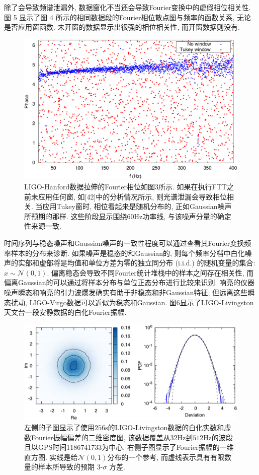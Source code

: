 \documentclass[a4paper]{\documentclassname}
\def\t{\text}
\theoremstyle{definition}
\begin{document}
除了会导致频谱泄漏外, 数据窗化不当还会导致Fourier变换中的虚假相位相关性. 图 5 显示了图 4 所示的相同数据段的Fourier相位散点图与频率的函数关系, 无论是否应用窗函数. 未开窗的数据显示出很强的相位相关性, 而开窗数据则没有. 
\begin{figure}[htbp]
    \centering
    \includegraphics{img/5.jpg}
    \caption{
        LIGO-Hanford数据拉伸的Fourier相位如图3所示. 如果在执行FTT之前未应用任何窗, 如[42]中的分析情况所示, 则光谱泄漏会导致相位相关. 当应用Tukey窗时, 相位看起来是随机分布的, 正如Gaussian噪声所预期的那样. 这些阶段显示围绕$60\t{Hz}$功率线, 与该噪声分量的确定性来源一致. 
    }
\end{figure}

时间序列与稳态噪声和Gaussian噪声的一致性程度可以通过查看其Fourier变换频率样本的分布来诊断. 如果噪声是稳态的和Gaussian的, 则每个频率分档中白化噪声的实部和虚部将是均值和单位方差为零的独立同分布 (i.i.d.)  的随机变量的集合: $x\sim\mathcal{N}(0,1)$. 偏离稳态会导致不同Fourier统计堆栈中的样本之间存在相关性, 而偏离Gaussian的可以通过将样本分布与单位正态分布进行比较来识别. 响亮的仪器噪声瞬态和响亮的引力波爆发确实有助于非稳态和非Gaussian特征, 但远离这些瞬态扰动, LIGO-Virgo数据可以近似为稳态和Gaussian. 图6显示了LIGO-Livingston天文台一段安静数据的白化Fourier振幅. 
\begin{figure}[htbp]
    \centering
    \includegraphics{img/6.jpg}
    \caption{
        左侧的子图显示了使用$256\t{s}$的LIGO-Livingston数据的白化实数和虚数Fourier振幅偏差的二维密度图, 该数据覆盖从$32\t{Hz}$到$512\t{Hz}$的波段且以GPS时间1186741733为中心. 右侧子图显示了Fourier振幅的一维直方图. 实线是给$\mathcal{N}(0,1)$分布的一个参考, 而虚线表示具有有限数量的样本所导致的预期 3-$\sigma$ 方差. 
    }
\end{figure}
\end{document}
